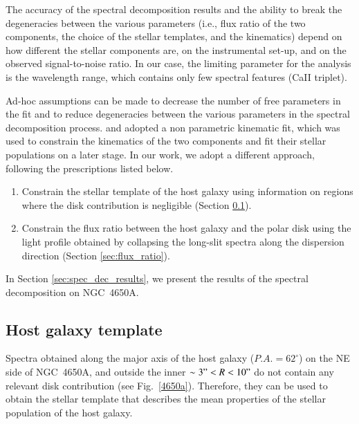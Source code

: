 \documentclass{aa}
\begin{document}
The accuracy of the spectral decomposition results and the ability to
break the degeneracies between the various parameters (i.e., flux ratio
of the two components, the choice of the stellar templates, and the
kinematics) depend on how different the stellar components are, on the
instrumental set-up, and on the observed signal-to-noise ratio.  In
our case, the limiting parameter for the analysis is the wavelength
range, which contains only few spectral features (Ca{\small II}
triplet).

Ad-hoc assumptions can be made to decrease the number of free
parameters in the fit and to reduce degeneracies between the various
parameters in the spectral decomposition process. \citet{Katkov+13}
and \citet{Fabricius+14} adopted a non parametric kinematic fit, which
was used to constrain the kinematics of the two components and fit
their stellar populations on a later stage. In our work, we adopt a
different approach, following the prescriptions listed below.

\begin{enumerate}

  \item Constrain the stellar template of the host galaxy using
    information on regions where the disk contribution is negligible
    (Section \ref{sec:galaxy_template}).

  \item Constrain the flux ratio between the host galaxy and the polar
    disk  using the light profile obtained by collapsing the
      long-slit spectra along the dispersion direction (Section
    \ref{sec:flux_ratio}).

\end{enumerate}

In Section \ref{sec:spec_dec_results}, we present the results of the
spectral decomposition on NGC~4650A.


\subsection{Host galaxy template}
\label{sec:galaxy_template}

Spectra obtained along the major axis of the host galaxy
($P.A.=62^{\circ}$) on the NE side of NGC~4650A, and outside
the inner $\sim 3"<R<10"$ do not contain any relevant disk contribution (see
Fig.~\ref{4650a}). Therefore, they can be used to obtain the stellar
template that describes the mean properties of the stellar population
of the host galaxy.
\end{document}
